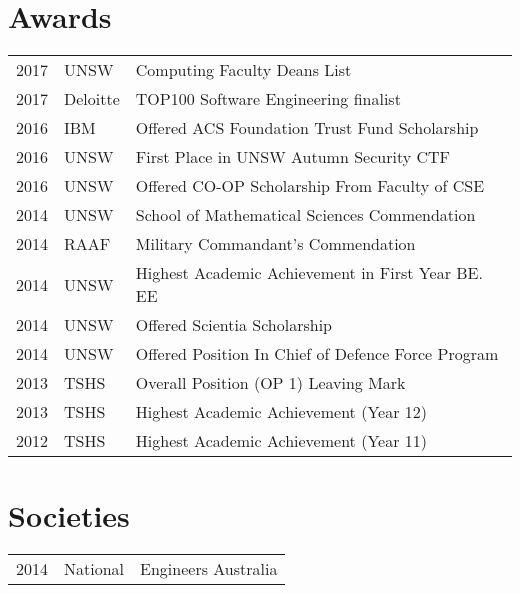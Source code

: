 \documentclass[letterpaper]{deedy-resume} %
\begin{document}
\begin{minipage}[t]{0.60\textwidth}
\section{Awards} 

\begin{tabular}{rll}
2017 & UNSW & Computing Faculty Deans List \\
2017 & Deloitte & TOP100 Software Engineering finalist \\
2016 & IBM &  Offered ACS Foundation Trust Fund Scholarship \\
2016 & UNSW & First Place in UNSW Autumn Security CTF \\
2016 & UNSW & Offered CO-OP Scholarship From Faculty of CSE\\
2014 & UNSW & School of Mathematical Sciences Commendation\\
2014 & RAAF & Military Commandant's Commendation\\
2014 & UNSW & Highest Academic Achievement in First Year BE. EE\\
2014 & UNSW & Offered Scientia Scholarship\\
2014 & UNSW & Offered Position In Chief of Defence Force Program\\
2013	& TSHS & Overall Position (OP 1) Leaving Mark\\
2013 & TSHS & Highest Academic Achievement (Year 12)\\
2012 & TSHS & Highest Academic Achievement (Year 11)\\
\end{tabular}

\sectionspace %


\section{Societies} 

\begin{tabular}{rll}
2014 & National & Engineers Australia\\
\end{tabular}

\sectionspace %


\end{minipage} %
\end{document}
